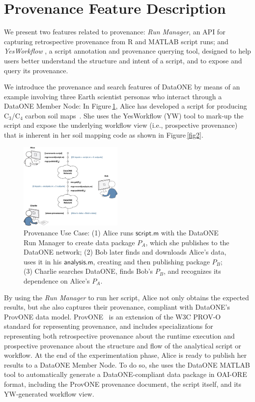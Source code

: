 \documentclass[a4paper]{llncs}
\newcommand{\code}[1]{\ensuremath{\mathsf{#1}}}
\newcommand{\Figref}[1]{Figure\,\ref{#1}}
\begin{document}
\section{Provenance Feature Description}  \label{demo}

We present two features related to provenance: \emph{Run Manager}, an API for capturing retrospective provenance from R \cite{recordr} and MATLAB \cite{matlabdataone} script runs; and \emph{YesWorkflow} \cite{yesworkflow}, a script annotation and provenance querying tool, designed to help users better understand the structure and intent of a script, and to expose and query its provenance.

We introduce the provenance and search features of DataONE by means of an example involving three Earth scientist personas who interact through a DataONE Member Node: In \Figref{fig0}, Alice has developed a script for producing C$_3$/C$_4$ carbon soil maps~\cite{MsTMIP-model-driver-data-set}.  She uses the YesWorkflow (YW) tool to mark-up the script and expose the underlying workflow view (i.e., prospective provenance) that is inherent in her soil mapping code as shown in \Figref{fig2}.

\begin{figure}[t]  
\centering 
\includegraphics[width=0.45\textwidth]{figs/alice-bob-charlie-sequence-crop} \caption{Provenance Use Case: (1) Alice runs \code{script.m} with the DataONE Run Manager to create data package $P_A$, which she publishes to the DataONE network; (2) Bob later finds and downloads Alice's data, uses it in his \code{analysis.m}, creating and then publishing package $P_B$; (3) Charlie searches DataONE, finds Bob's $P_B$, and recognizes its dependence on Alice's $P_A$.}  \label{fig0} 
\end{figure}

By using the \emph{Run Manager} to run her script, Alice not only obtains the expected results, but she also captures their provenance, compliant with DataONE's ProvONE data model. 
ProvONE~\cite{provone} is an extension of the W3C PROV-O~\cite{prov-o} standard for representing provenance, and includes specializations for representing both retrospective provenance about the runtime execution and prospective provenance about the structure and flow of the analytical script or workflow.
%
At the end of the experimentation phase, Alice is ready to publish her results to a DataONE Member Node.  To do so, she uses the DataONE MATLAB tool to automatically generate a DataONE-compliant data package in OAI-ORE format, including the ProvONE provenance document, the script itself, and its YW-generated workflow view.
\end{document}
